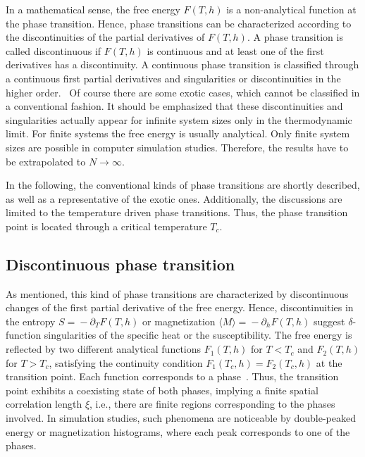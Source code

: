 In a mathematical sense, the free energy $F(T,h)$ is a non-analytical function at the phase transition. Hence, phase transitions can be characterized 
according to the discontinuities of the partial derivatives of $F(T,h)$. A phase transition is called discontinuous if $F(T,h)$ is continuous and at least 
one  of the first derivatives has a discontinuity. A continuous phase transition is classified through a continuous first partial derivatives and singularities
or discontinuities in the higher order.~\cite{Schwabl2000} Of course there are some exotic cases, which cannot be classified in a conventional fashion. It 
should be emphasized that these discontinuities and singularities actually appear for infinite system sizes only in the thermodynamic limit. For finite systems 
the free energy is usually analytical. Only finite system sizes are possible in computer simulation studies. Therefore, the results have to be extrapolated 
to $N\!\to\!\infty$.~\cite{Janke2012}

In the following, the conventional kinds of phase transitions are shortly described, as well as a representative of the exotic ones. Additionally, the discussions
are limited to the temperature driven phase transitions. Thus, the phase transition point is located through a critical temperature $T_c$.





\subsection*{Discontinuous phase transition}

As mentioned, this kind of phase transitions are characterized by discontinuous changes of the first partial derivative of the free energy. Hence, discontinuities
in the entropy $S\!=\!-\partial_TF(T,h)$ or magnetization $\langle M\rangle\!=\!-\partial_hF(T,h)$ suggest $\delta$-function singularities of the specific heat
or the susceptibility. The free energy is reflected by two different analytical functions
$F_1(T,h)$ for $T\!<\!T_c$ and $F_2(T,h)$ for $T\!>\!T_c$, satisfying the continuity condition $F_1(T_c,h)\!=\!F_2(T_c,h)$ at the transition point. 
Each function corresponds to a phase~\cite{Landau1976}. Thus, the 
transition point exhibits a coexisting state of both phases, implying a finite spatial correlation length $\xi$, i.e., there are finite regions 
corresponding to the phases  involved. In simulation studies, such phenomena are noticeable by double-peaked energy or magnetization histograms,
where each peak corresponds to one of the phases.~\cite{Janke2003}

